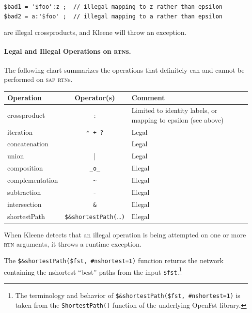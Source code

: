 \documentclass[letterpaper,12pt]{article}
\newcommand{\acro}{\textsc}
\begin{document}
\begin{Verbatim}[fontsize=\small]
$bad1 = '$foo':z ;  // illegal mapping to z rather than epsilon
$bad2 = a:'$foo' ;  // illegal mapping to a rather than epsilon
\end{Verbatim}

\noindent
are illegal crossproducts, and Kleene will throw an exception.

\paragraph{Legal and Illegal Operations on \acro{rtn}s.}

The following chart summarizes the operations that definitely can and
cannot be performed on \acro{sap} \acro{rtn}s.

\vspace{.5cm}

\noindent
\begin{tabular}{|l|c|p{5.7cm}|}
\hline
\textbf{Operation} & \textbf{Operator(s)} & \textbf{Comment} \\
\hline
\hline
crossproduct & : & Limited to identity labels, or mapping to epsilon (see
above)\\
\hline
iteration & \verb!* + ?! {} & Legal \\
\hline
concatenation & & Legal \\
\hline
union & | & Legal \\
\hline
\hline
composition & \verb!_o_! & Illegal \\
\hline
complementation & \verb!~! & Illegal \\
\hline
subtraction & - & Illegal \\
\hline
intersection & \verb!&! & Illegal \\
\hline
shortestPath & \verb!$&shortestPath(!\ldots\verb!)! & Illegal \\
\hline
\end{tabular}

\vspace{.5cm}

\noindent
When Kleene detects that an illegal operation is being attempted on one or more
\acro{rtn} arguments, it throws a runtime exception.


The \verb!$&shortestPath($fst, #nshortest=1)! function returns the
network containing the nshortest ``best'' paths from the input
\verb!$fst!.\footnote{The terminology and behavior of
\verb!$&shortestPath($fst, #nshortest=1)! is taken from the
\verb!ShortestPath()! function of the underlying OpenFst library.}  
\end{document}
